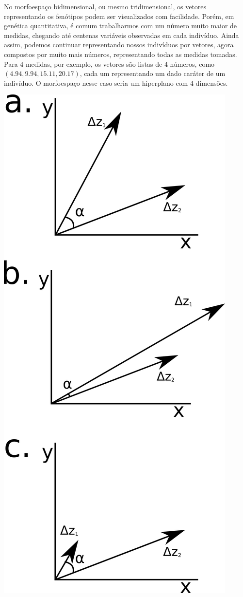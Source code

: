 \documentclass[portuges,]{tufte-handout}
\begin{document}
No morfoespaço bidimensional, ou mesmo tridimensional, os vetores
representando os fenótipos podem ser visualizados com facilidade. Porém,
em genética quantitativa, é comum trabalharmos com um número muito maior
de medidas, chegando até centenas variáveis observadas em cada
indivíduo. Ainda assim, podemos continuar representando nossos
indivíduos por vetores, agora compostos por muito mais números,
representando todas as medidas tomadas. Para 4 medidas, por exemplo, os
vetores são listas de 4 números, como \((4.94, 9.94, 15.11, 20.17)\),
cada um representando um dado caráter de um indivíduo. O morfoespaço
nesse caso seria um hiperplano com 4 dimensões.

\begin{marginfigure}
\includegraphics{./figuras/deltazes.png}

\end{marginfigure}
\end{document}

